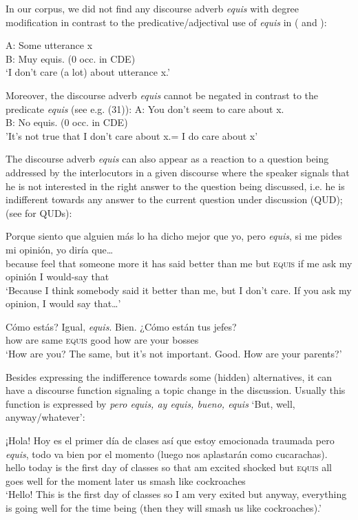 \documentclass[output=paper]{langsci/langscibook}
\begin{document}
In our corpus, we did not find any discourse adverb \textit{equis} with degree modification in contrast to the predicative/adjectival use of \textit{equis} in ( and ):

\ea
\gll A: Some utterance x \\
B: Muy equis. (0 occ. in CDE)\\
\glt ‘I don’t care (a lot) about utterance x.’
\z

Moreover, the discourse adverb \textit{equis} cannot be negated in contrast to the predicate \textit{equis} (see e.g. (31)):
\ea
\gll A: You don't seem to care about x. \\
B: No equis. (0 occ. in CDE)\\
\glt 'It's not true that I don't care about x.= I do care about x'
\z

The discourse adverb \textit{equis} can also appear as a reaction to a question being addressed by the interlocutors in a given discourse where the speaker signals that he is not interested in the right answer to the question being discussed, i.e. he is indifferent towards any answer to the current question under discussion (QUD); (see \citealt{Roberts1996} for QUDs):

\ea
\gll Porque siento que alguien más lo ha dicho mejor que yo, pero \textit{equis}, si me pides mi opinión, yo diría que…\\
because feel that someone more it has said better than me but \textsc{equis}	if me ask my opinión I would-say that\\
\glt ‘Because I think somebody said it better than me, but I don’t care. If you ask my opinion, I would say that…’
\z

\ea
{}Cómo	estás? Igual, \textit{equis}. Bien. {¿}Cómo están tus jefes?\\
how are same \textsc{equis} good how are your bosses\\
\glt ‘How are you? The same, but it’s not important. Good. How are your parents?’
\z

Besides expressing the indifference towards some (hidden) alternatives, it can have a discourse function signaling a topic change in the discussion. Usually this function is expressed by \textit{pero equis, ay equis, bueno, equis} ‘But, well, anyway/whatever’:

\ea
\gll ¡Hola! Hoy es el primer día de clases así que estoy emocionada traumada pero \textit{equis}, todo va bien por el momento (luego nos aplastarán como cucarachas).\\
hello today is the first day of classes so that am excited shocked but \textsc{equis} all goes well for the moment later us smash like cockroaches\\
\glt ‘Hello! This is the first day of classes so I am very exited but anyway, everything is going well for the time being (then they will smash us like cockroaches).’
\z
\end{document}
